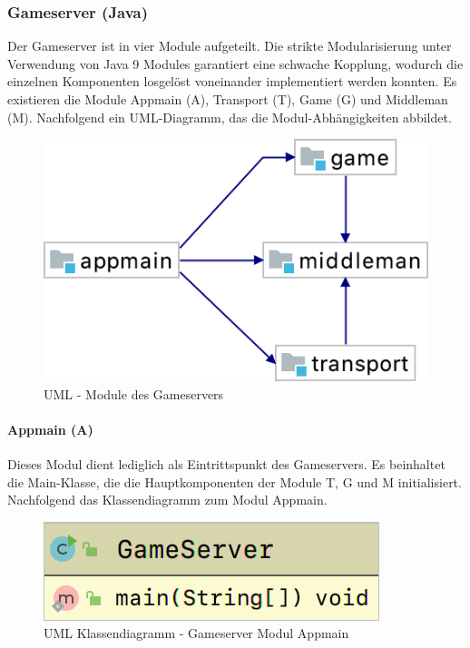 \documentclass[11pt,ngerman]{article}
\begin{document}
    \subsubsection{Gameserver  (Java)}
	Der Gameserver ist in vier Module aufgeteilt. Die strikte Modularisierung unter Verwendung von Java 9 Modules garantiert eine schwache Kopplung, wodurch die einzelnen Komponenten losgelöst voneinander implementiert werden konnten. Es existieren die Module Appmain (A), Transport (T), Game (G) und Middleman (M). Nachfolgend ein UML-Diagramm, das die Modul-Abhängigkeiten abbildet.

	\begin{figure}[H]
    	\centering
    	\includegraphics[scale=0.5]{figures/gameserver-uml/modules.png}
    	\caption{UML - Module des Gameservers}
    	\label{fig:UMLModule}
    \end{figure}

	\paragraph{Appmain (A)}
	Dieses Modul dient lediglich als Eintrittspunkt des Gameservers. Es beinhaltet die Main-Klasse, die die Hauptkomponenten der Module T, G und M initialisiert. Nachfolgend das Klassendiagramm zum Modul Appmain.

	\begin{figure}[H]
    	\centering
    	\includegraphics[scale=0.4]{figures/gameserver-uml/appmain-classes.png}
    	\caption{UML Klassendiagramm - Gameserver Modul Appmain}
    	\label{fig:UMLModulAppmain}
    \end{figure}
\end{document}
